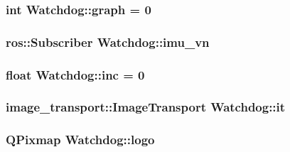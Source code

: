 \subsubsection[{\texorpdfstring{graph}{graph}}]{\setlength{\rightskip}{0pt plus 5cm}int Watchdog\+::graph = 0\hspace{0.3cm}{\ttfamily [private]}}\hypertarget{classWatchdog_a4f7cb13643cd104c5bf10c3858175737}{}\label{classWatchdog_a4f7cb13643cd104c5bf10c3858175737}
\subsubsection[{\texorpdfstring{imu\+\_\+vn}{imu_vn}}]{\setlength{\rightskip}{0pt plus 5cm}ros\+::\+Subscriber Watchdog\+::imu\+\_\+vn\hspace{0.3cm}{\ttfamily [private]}}\hypertarget{classWatchdog_a8081086de57c6ebaf9a536928d993501}{}\label{classWatchdog_a8081086de57c6ebaf9a536928d993501}
\subsubsection[{\texorpdfstring{inc}{inc}}]{\setlength{\rightskip}{0pt plus 5cm}float Watchdog\+::inc = 0\hspace{0.3cm}{\ttfamily [private]}}\hypertarget{classWatchdog_a1dfdc172bb68d432a8319bc2420fda23}{}\label{classWatchdog_a1dfdc172bb68d432a8319bc2420fda23}
\subsubsection[{\texorpdfstring{it}{it}}]{\setlength{\rightskip}{0pt plus 5cm}image\+\_\+transport\+::\+Image\+Transport Watchdog\+::it\hspace{0.3cm}{\ttfamily [private]}}\hypertarget{classWatchdog_a974840a83972203cd2cbcf34f9b08907}{}\label{classWatchdog_a974840a83972203cd2cbcf34f9b08907}
\subsubsection[{\texorpdfstring{logo}{logo}}]{\setlength{\rightskip}{0pt plus 5cm}Q\+Pixmap Watchdog\+::logo}\hypertarget{classWatchdog_a0d1fa20c84e3244a915b0e0170626ffe}{}\label{classWatchdog_a0d1fa20c84e3244a915b0e0170626ffe}
